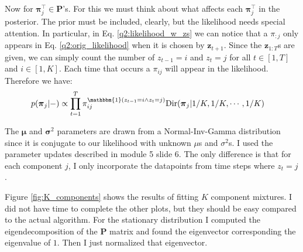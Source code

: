 Now for $\boldsymbol{\pi}_j^\intercal \in \mathbf{P}$'s. 
For this we must think about what affects each $\boldsymbol{\pi}_j^\intercal$ in the posterior. 
The prior must be included, clearly, but the likelihood needs special attention.
In particular, in Eq. \ref{q2:likelihood_w_zs} we can notice that a $\pi_{:j}$ only appears in Eq. \ref{q2:orig_likelihood} when it is chosen by $\mathbf{z}_{t+1}$.
Since the $\mathbf{z}_{1:T}$s are given, we can simply count the number of $z_{t-1} = i$ and $z_t =j$ for all $t\in[1, T]$ and $i\in [1,K]$.
Each time that occurs a $\pi_{ij}$ will appear in the likelihood.
Therefore we have: 
\begin{align}
    p(\boldsymbol{\pi}_j|-) &\propto 
    \prod_{t=1}^T \pi_{ij}^{\mathbbm{1}(z_{t-1} = i \land z_t = j)} \text{Dir}(\boldsymbol{\pi}_j|1/K, 1/K, \cdots, 1/K)
\end{align}

The $\mathbf{\mu}$ and $\mathbf{\sigma}^2$ parameters are drawn from a Normal-Inv-Gamma distribution since it is conjugate to our likelihood with unknown $\mu$s and $\sigma^2$s. 
I used the parameter updates described in module 5 slide 6. 
The only difference is that for each component $j$, I only incorporate the datapoints from time steps where $z_t = j$.

Figure \ref{fig:K_components} shows the results of fitting $K$ component mixtures.
I did not have time to complete the other plots, but they should be easy compared to the actual algorithm.
For the stationary distribution I computed the eigendecomposition of the $\mathbf{P}$ matrix and found the eigenvector corresponding the eigenvalue of $1$.
Then I just normalized that eigenvector. 


